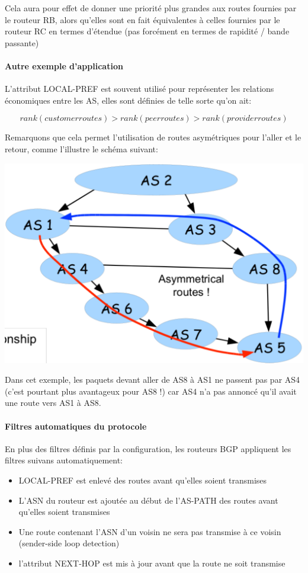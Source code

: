 \documentclass{article}
\begin{document}
\begin{sffamily}
Cela aura pour effet de donner une priorité plus grandes aux routes
fournies par le routeur RB, alors qu'elles sont en fait équivalentes à
celles fournies par le routeur RC en termes d'étendue (pas forcément
en termes de rapidité / bande passante)

\paragraph{Autre exemple d'application}

L'attribut LOCAL-PREF est souvent utilisé pour représenter les
relations économiques entre les AS, elles sont définies de telle sorte
qu'on ait:

\[rank(customer routes) > rank(peer routes) > rank(provider routes)\]

Remarquons que cela permet l'utilisation de routes asymétriques pour
l'aller et le retour, comme l'illustre le schéma suivant:

\includegraphics[width=\textwidth]{fab_005.pdf}

Dans cet exemple, les paquets devant aller de AS8 à AS1 ne passent pas
par AS4 (c'est pourtant plus avantageux pour AS8 !) car AS4 n'a pas
annoncé qu'il avait une route vers AS1 à AS8.

\paragraph{Filtres automatiques du protocole}

En plus des filtres définis par la configuration, les routeurs BGP
appliquent les filtres suivans automatiquement:

\begin{itemize}
\item LOCAL-PREF est enlevé des routes avant qu'elles soient transmises
\item L'ASN du routeur est ajoutée au début de l'AS-PATH des routes
  avant qu'elles soient transmises
\item Une route contenant l'ASN d'un voisin ne sera pas transmise à ce
  voisin (sender-side loop detection)
\item l'attribut NEXT-HOP est mis à jour avant que la route ne soit
  transmise
\end{itemize}


\end{sffamily}
\end{document}

